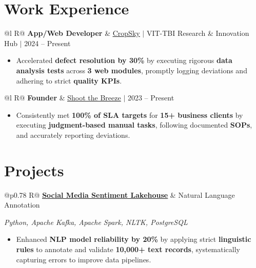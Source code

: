 \documentclass[a4paper,10pt]{article}
\newcommand{\ulink}[2]{\href{#1}{\uline{#2}}}
\newcommand{\subheading}[1]{{\color[HTML]{0A0A0A}\fontsize{12}{14}\selectfont\bfseries #1}}
\newcommand{\techstack}[1]{{\color[HTML]{5C5C5C}\fontsize{10.5}{12.5}\selectfont\itshape #1}}
\newcommand{\meta}[1]{{\color[HTML]{5C5C5C}\fontsize{10.5}{12.5}\selectfont #1}}
\begin{document}
\vspace{2pt}

\section{Work Experience}
\vspace{2pt}

\begin{tabularx}{\linewidth}{@{}l R@{}}
\subheading{App/Web Developer} & \meta{\ulink{https://sites.google.com/view/cropsky/home}{CropSky} $|$ VIT-TBI Research \& Innovation Hub $|$ 2024 -- Present}
\end{tabularx}
\begin{itemize}[nosep, leftmargin=1.5em, itemsep=1pt, topsep=2pt]
  \item {\color[HTML]{0A0A0A}\fontsize{11}{14}\selectfont Accelerated \textbf{defect resolution by 30\%} by executing rigorous \textbf{data analysis tests} across \textbf{3 web modules}, promptly logging deviations and adhering to strict \textbf{quality KPIs}.}
\end{itemize}

\vspace{2pt}

\begin{tabularx}{\linewidth}{@{}l R@{}}
\subheading{Founder} & \meta{\ulink{https://shoot-the-breeze.vercel.app}{Shoot the Breeze} $|$ 2023 -- Present}
\end{tabularx}
\begin{itemize}[nosep, leftmargin=1.5em, itemsep=1pt, topsep=2pt]
  \item {\color[HTML]{0A0A0A}\fontsize{11}{14}\selectfont Consistently met \textbf{100\% of SLA targets} for \textbf{15+ business clients} by executing \textbf{judgment-based manual tasks}, following documented \textbf{SOPs}, and accurately reporting deviations.}
\end{itemize}

\vspace{2pt}

\section{Projects}
\vspace{2pt}

\begin{tabularx}{\linewidth}{@{}p{0.78\linewidth} R@{}}
\subheading{\ulink{https://github.com/su-jin1425/Social-Media-Sentiment-Lakehouse}{Social Media Sentiment Lakehouse}} & \meta{Natural Language Annotation}
\end{tabularx}
\vspace{1pt}
\techstack{Python, Apache Kafka, Apache Spark, NLTK, PostgreSQL}
\begin{itemize}[nosep, leftmargin=1.5em, itemsep=1pt, topsep=2pt]
  \item {\color[HTML]{0A0A0A}\fontsize{11}{14}\selectfont Enhanced \textbf{NLP model reliability by 20\%} by applying strict \textbf{linguistic rules} to annotate and validate \textbf{10,000+ text records}, systematically capturing errors to improve data pipelines.}
\end{itemize}
\end{document}
